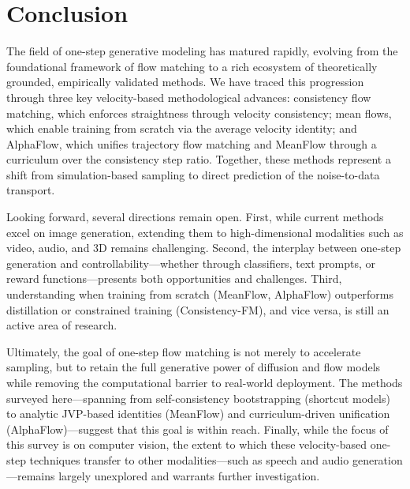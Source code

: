 \section{Conclusion}
\label{sec:conclusion}

The field of one-step generative modeling has matured rapidly, evolving from the foundational framework of flow matching to a rich ecosystem of theoretically grounded, empirically validated methods. We have traced this progression through three key velocity-based methodological advances: consistency flow matching, which enforces straightness through velocity consistency; mean flows, which enable training from scratch via the average velocity identity; and AlphaFlow, which unifies trajectory flow matching and MeanFlow through a curriculum over the consistency step ratio. Together, these methods represent a shift from simulation-based sampling to direct prediction of the noise-to-data transport.

Looking forward, several directions remain open. First, while current methods excel on image generation, extending them to high-dimensional modalities such as video, audio, and 3D remains challenging. Second, the interplay between one-step generation and controllability---whether through classifiers, text prompts, or reward functions---presents both opportunities and challenges. Third, understanding when training from scratch (MeanFlow, AlphaFlow) outperforms distillation or constrained training (Consistency-FM), and vice versa, is still an active area of research.

Ultimately, the goal of one-step flow matching is not merely to accelerate sampling, but to retain the full generative power of diffusion and flow models while removing the computational barrier to real-world deployment. The methods surveyed here---spanning from self-consistency bootstrapping (shortcut models) to analytic JVP-based identities (MeanFlow) and curriculum-driven unification (AlphaFlow)---suggest that this goal is within reach. Finally, while the focus of this survey is on computer vision, the extent to which these velocity-based one-step techniques transfer to other modalities---such as speech and audio generation---remains largely unexplored and warrants further investigation.
